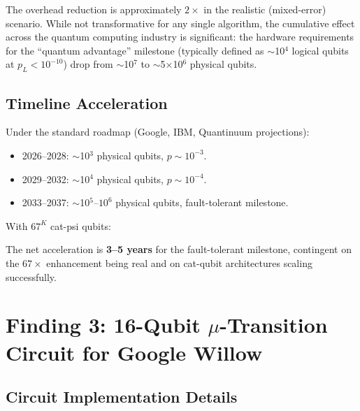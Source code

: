 \documentclass[11pt]{article}
\theoremstyle{definition}
\theoremstyle{remark}
\begin{document}
The overhead reduction is approximately $2\times$ in the realistic
(mixed-error) scenario. While not transformative for any single algorithm,
the cumulative effect across the quantum computing industry is significant:
the hardware requirements for the ``quantum advantage'' milestone (typically
defined as $\sim$10$^4$ logical qubits at $p_L < 10^{-10}$) drop from
$\sim$10$^7$ to $\sim$5$\times$10$^6$ physical qubits.

\subsection{Timeline Acceleration}

Under the standard roadmap (Google, IBM, Quantinuum projections):
\begin{itemize}[nosep]
\item 2026--2028: $\sim$10$^3$ physical qubits, $p \sim 10^{-3}$.
\item 2029--2032: $\sim$10$^4$ physical qubits, $p \sim 10^{-4}$.
\item 2033--2037: $\sim$10$^5$--$10^6$ physical qubits,
  fault-tolerant milestone.
\end{itemize}

With $67^K$ cat-psi qubits:

The net acceleration is \textbf{3--5 years} for the fault-tolerant
milestone, contingent on the $67\times$ enhancement being real and on
cat-qubit architectures scaling successfully.

\section{Finding 3: 16-Qubit $\mu$-Transition Circuit for Google Willow}
\label{sec:willow-circuit}

\subsection{Circuit Implementation Details}
\end{document}
